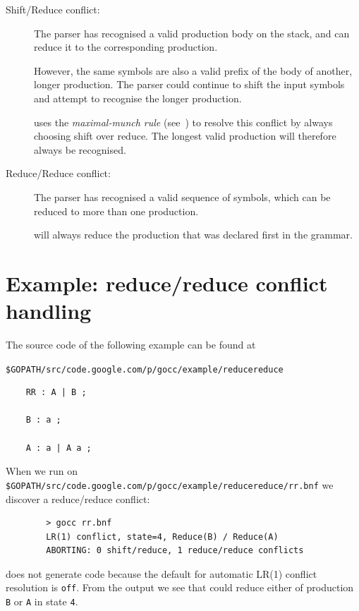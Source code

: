 \documentclass[12pt]{article}
\begin{document}
	\begin{description}
		\item[Shift/Reduce conflict:] The parser has recognised a valid production body on the stack, and can reduce it to the corresponding production. 

		However, the same symbols are also a valid prefix of the body of another, longer production. The parser could continue to shift the input symbols and attempt to recognise the longer production.

		\gocc uses the {\em maximal-munch rule} (see~\cite{Modern Compiler Design}) to resolve this conflict by always choosing shift over reduce. The longest valid production will therefore always be recognised.

		\item[Reduce/Reduce conflict:] The parser has recognised a valid sequence of symbols, which can be reduced to more than one production.

		\gocc will always reduce the production that was declared first in the grammar.
	\end{description}

\section{Example: reduce/reduce conflict handling} \label{sec:example rr}
	The source code of the following example can be found at

	\verb|$GOPATH/src/code.google.com/p/gocc/example/reducereduce|

	\begin{verbatim}
	RR : A | B ;

	B : a ;

	A : a | A a ;

	\end{verbatim}

	When we run \gocc on \verb|$GOPATH/src/code.google.com/p/gocc/example/reducereduce/rr.bnf| we discover a reduce/reduce conflict:

	\begin{verbatim}
		> gocc rr.bnf
		LR(1) conflict, state=4, Reduce(B) / Reduce(A)
		ABORTING: 0 shift/reduce, 1 reduce/reduce conflicts
	\end{verbatim}

	\gocc does not generate code because the default for automatic LR(1) conflict resolution is \verb|off|. From the output we see that \gocc could reduce either of production \verb|B| or \verb|A| in state \verb|4|.
\end{document}
